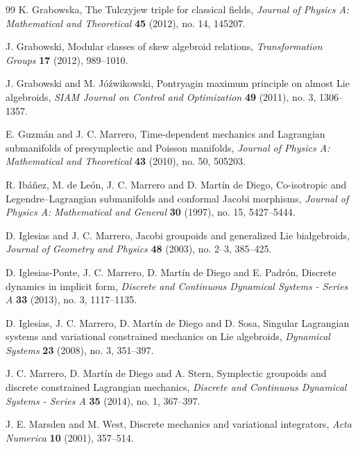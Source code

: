 \documentclass[11pt]{article}
\begin{document}
\begin{thebibliography}{99}
K. Grabowska,
The Tulczyjew triple for classical fields,
\textit{Journal of Physics A: Mathematical and Theoretical}
\textbf{45} (2012), no. 14, 145207.

J. Grabowski,
Modular classes of skew algebroid relations,
\textit{Transformation Groups}
\textbf{17} (2012), 989--1010.

J. Grabowski and M. J\'o\'zwikowski,
Pontryagin maximum principle on almost Lie algebroids,
\textit{SIAM Journal on Control and Optimization}
\textbf{49} (2011), no. 3, 1306--1357.

E. Guzm\'an and J. C. Marrero,
Time-dependent mechanics and Lagrangian submanifolds of presymplectic and Poisson manifolds,
\textit{Journal of Physics A: Mathematical and Theoretical}
\textbf{43} (2010), no. 50, 505203.

R. Ib\'a\~nez, M. de Le\'on, J. C. Marrero and D. Mart\'in de Diego,
Co-isotropic and Legendre--Lagrangian submanifolds and conformal Jacobi morphisms,
\textit{Journal of Physics A: Mathematical and General}
\textbf{30} (1997), no. 15, 5427--5444.

D. Iglesias and J. C. Marrero,
Jacobi groupoids and generalized Lie bialgebroids,
\textit{Journal of Geometry and Physics}
\textbf{48} (2003), no. 2--3, 385--425.

D. Iglesias-Ponte, J. C. Marrero, D. Mart\'in de Diego and E. Padr\'on,
Discrete dynamics in implicit form,
\textit{Discrete and Continuous Dynamical Systems - Series A}
\textbf{33} (2013), no. 3, 1117--1135.

D. Iglesias, J. C. Marrero, D. Mart\'in de Diego and D. Sosa,
Singular Lagrangian systems and variational constrained mechanics on Lie algebroids,
\textit{Dynamical Systems}
\textbf{23} (2008), no. 3, 351--397.

J. C. Marrero, D. Mart\'in de Diego and A. Stern,
Symplectic groupoids and discrete constrained Lagrangian mechanics,
\textit{Discrete and Continuous Dynamical Systems - Series A}
\textbf{35} (2014), no. 1, 367--397.

J. E. Marsden and M. West,
Discrete mechanics and variational integrators,
\textit{Acta Numerica}
\textbf{10} (2001), 357--514.


\end{thebibliography}
\end{document}
